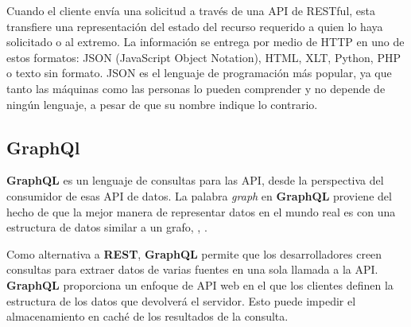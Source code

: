  
Cuando el cliente envía una solicitud a través de una API de RESTful, esta transfiere una representación del estado del recurso requerido a quien lo haya solicitado o al extremo. La información se entrega por medio de HTTP en uno de estos formatos: JSON (JavaScript Object Notation), HTML, XLT, Python, PHP o texto sin formato. JSON es el lenguaje de programación más popular, ya que tanto las máquinas como las personas lo pueden comprender y no depende de ningún lenguaje, a pesar de que su nombre indique lo contrario. 



\subsection{GraphQl}

\textbf{GraphQL} es un lenguaje de consultas para las API, desde la perspectiva del consumidor  de esas API de datos. La palabra \textit{graph} en \textbf{GraphQL} proviene del hecho de que la mejor manera de representar datos en el mundo real es con una estructura de datos similar a un grafo, ,  .


Como alternativa a \textbf{REST}, \textbf{GraphQL} permite que los desarrolladores creen consultas para extraer datos de varias fuentes en una sola llamada a la API. \textbf{GraphQL} proporciona un enfoque de API web en el que los clientes definen la estructura de los datos que devolverá el servidor. Esto puede impedir el almacenamiento en caché  de los resultados de la consulta.

